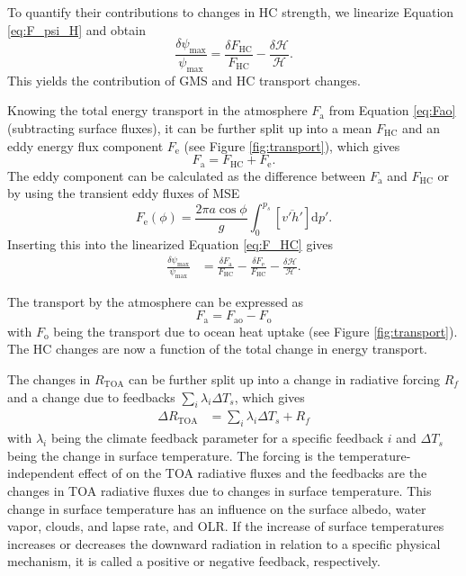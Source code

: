 To quantify their contributions to changes in HC strength, we linearize Equation \eqref{eq:F_psi_H} and obtain 
\begin{equation}
        \frac{\delta\psi_\mathrm{max}}{\psi_\mathrm{max}}=\frac{\delta F_\mathrm{HC}}{F_\mathrm{HC}}-\frac{\delta \mathcal{H} }{\mathcal{H} }.
\end{equation}
This yields the contribution of GMS and HC transport changes.

Knowing the total energy transport in the atmosphere $F_\mathrm{a}$ from Equation \eqref{eq:Fao} (subtracting surface fluxes), it can be further split up into a mean $F_\mathrm{HC}$ and an eddy energy flux component $F_\mathrm{e}$ (see Figure \ref{fig:transport}), which gives
\begin{equation}
    F_\mathrm{a}=F_\mathrm{HC}+F_\mathrm{e}.
\end{equation}
The eddy component can be calculated as the difference between $F_\mathrm{a}$ and $F_\mathrm{HC}$ or by using the transient eddy fluxes of MSE
\begin{equation}
    F_\mathrm{e}(\phi)=\frac{2\pi a\cos\phi}{g}\int^{p_s}_0[\overline{v'h'}]\mathrm{d}p'.
\end{equation}
Inserting this into the linearized Equation \eqref{eq:F_HC} gives
\begin{align*}
    \frac{\delta\psi_\mathrm{max}}{\psi_\mathrm{max}}&=\frac{\delta F_\mathrm{a}}{F_\mathrm{HC}}-\frac{\delta F_\mathrm{e}}{F_\mathrm{HC}}-\frac{\delta \mathcal{H} }{\mathcal{H} }.
\end{align*}

The transport by the atmosphere can be expressed as 
\begin{equation}
    F_\mathrm{a}=F_\mathrm{ao}-F_\mathrm{o}    
\end{equation}
with $F_\mathrm{o}$ being the transport due to ocean heat uptake (see Figure \ref{fig:transport}). The HC changes are now a function of the total change in energy transport. 

The changes in $R_\mathrm{TOA}$ can be further split up into a change in radiative forcing $R_f$ and a change due to feedbacks $\sum_i\lambda_i\Delta T_s$, which gives 
\begin{align}\label{eq:forc_fdb}
    \Delta R_\mathrm{TOA}&=\sum_i\lambda_i\Delta T_s+R_f
\end{align}
with $\lambda_i$ being the climate feedback parameter for a specific feedback $i$ and $\Delta T_s$ being the change in surface temperature. The forcing is the temperature-independent effect of \CO on the TOA radiative fluxes and the feedbacks are the changes in TOA radiative fluxes due to changes in surface temperature. This change in surface temperature has an influence on the surface albedo, water vapor, clouds, and lapse rate, and OLR. If the increase of surface temperatures increases or decreases the downward radiation in relation to a specific physical mechanism, it is called a positive or negative feedback, respectively.

